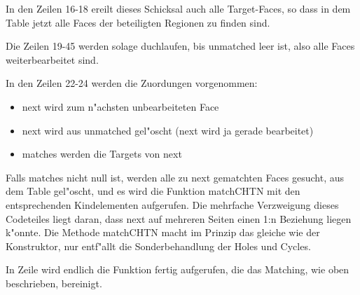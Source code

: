 In den Zeilen 16-18 ereilt dieses Schicksal auch alle Target-Faces, so dass in dem Table jetzt alle Faces der beteiligten Regionen zu finden sind.

Die Zeilen 19-45 werden solage duchlaufen, bis unmatched leer ist, also alle Faces weiterbearbeitet sind.

In den Zeilen 22-24 werden die Zuordungen vorgenommen:
\begin{itemize}
\item next wird zum n"achsten unbearbeiteten Face
\item next wird aus unmatched gel"oscht (next wird ja gerade bearbeitet)
\item matches werden die Targets von next

\end{itemize} 
Falls matches nicht null ist, werden alle zu next gematchten Faces gesucht, aus dem Table gel"oscht, und es wird die Funktion matchCHTN mit den entsprechenden Kindelementen aufgerufen. Die mehrfache Verzweigung dieses Codeteiles liegt daran, dass next auf mehreren Seiten einen 1:n Beziehung liegen k"onnte. Die Methode matchCHTN macht im Prinzip das gleiche wie der Konstruktor, nur entf"allt die Sonderbehandlung der Holes und Cycles.

In Zeile wird endlich die Funktion fertig aufgerufen, die das Matching, wie oben beschrieben, bereinigt.



